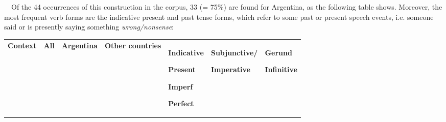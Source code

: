 \documentclass[10pt]{article}
\newenvironment{styleStandard}{\renewcommand\baselinestretch{1.25}\setlength\leftskip{0cm}\setlength\rightskip{0cm}\setlength\parindent{0cm}\setlength\parfillskip{0pt plus 1fil}\setlength\parskip{0in plus 1pt}\writerlistparindent\writerlistleftskip\leavevmode\normalfont\normalsize\fontsize{12pt}{14.4pt}\selectfont\writerlistlabel\ignorespaces}{\unskip\vspace{0in plus 1pt}\par}
\newcommand\writerlistleftskip{}
\newcommand\writerlistparindent{}
\newcommand\writerlistlabel{}
\begin{document}
\begin{styleStandard}
\ \ Of the 44 occurrences of this construction in the corpus, 33 (= 75\%) are found for Argentina, as the following table shows. Moreover, the most frequent verb forms are the indicative present and past tense forms, which refer to some past or present speech events, i.e. someone said or is presently saying something \textit{wrong/nonsense}:
\end{styleStandard}

\begin{center}
\tablefirsthead{}
\tablehead{}
\tabletail{}
\tablelasttail{}
\begin{supertabular}{|m{1.2983599in}|m{0.41085985in}|m{0.6101598in}|m{0.70945984in}|m{0.6101598in}|m{0.8073598in}|m{0.6295598in}|}
\hline
\centering \textbf{Context} &
\centering \textbf{All} &
\centering \textbf{Argentina} &
\centering \textbf{Other countries} &
{\centering \textbf{Indicative}\par}

{\centering \textbf{Present}\par}

{\centering \textbf{Imperf}\par}

\centering \textbf{Perfect} &
{\centering \textbf{Subjunctive/}\par}

\centering \textbf{Imperative} &
{\centering \textbf{Gerund}\par}

{\centering \textbf{Infinitive}\par}


\end{supertabular}
\end{center}
\end{document}
